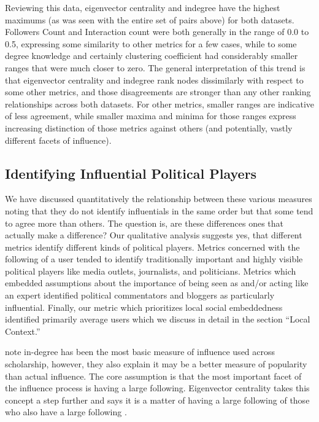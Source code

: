 \documentclass[a4paper,12pt]{article}
\begin{document}
Reviewing this data, eigenvector centrality and indegree have the highest maximums (as was seen with the entire set of pairs above) for both datasets. Followers Count and Interaction count were both generally in the range of 0.0 to 0.5, expressing some similarity to other metrics for a few cases, while to some degree knowledge and certainly clustering coefficient had considerably smaller ranges that were much closer to zero. The general interpretation of this trend is that eigenvector centrality and indegree rank nodes dissimilarly with respect to some other metrics, and those disagreements are stronger than any other ranking relationships across both datasets. For other metrics, smaller ranges are indicative of less agreement, while smaller maxima and minima for those ranges express increasing distinction of those metrics against others (and potentially, vastly different facets of influence). 


\subsection{Identifying Influential Political Players}

We have discussed quantitatively the relationship between these various measures noting that they do not identify influentials in the same order but that some tend to agree more than others. The question is, are these differences ones that actually make a difference? Our qualitative analysis suggests yes, that different metrics identify different kinds of political players. Metrics concerned with the following of a user tended to identify traditionally important and highly visible political players like media outlets, journalists, and politicians. Metrics which embedded assumptions about the importance of being seen as and/or acting like an expert identified political commentators and bloggers as particularly influential. Finally, our metric which prioritizes local social embeddedness identified primarily average users which we discuss in detail in the section ``Local Context.''

\cite{Cha} note in-degree has been the most basic measure of influence used across scholarship, however, they also explain it may be a better measure of popularity than actual influence. The core assumption is that the most important facet of the influence process is having a large following. Eigenvector centrality takes this concept a step further and says it is a matter of having a large following of those who also have a large following \cite{ShammaKennedyChurchill2009}.
\end{document}
